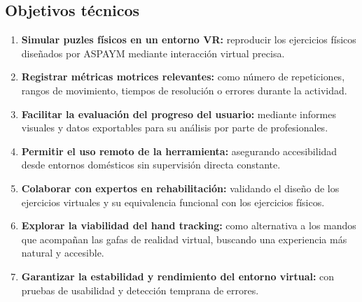 \subsection{Objetivos técnicos}
\label{Objetivos técnicos}
\begin{enumerate}
    \item \textbf{Simular puzles físicos en un entorno VR:} reproducir los ejercicios físicos diseñados por ASPAYM mediante interacción virtual precisa.
    
    \item \textbf{Registrar métricas motrices relevantes:} como número de repeticiones, rangos de movimiento, tiempos de resolución o errores durante la actividad.
    
    \item \textbf{Facilitar la evaluación del progreso del usuario:} mediante informes visuales y datos exportables para su análisis por parte de profesionales.
    
    \item \textbf{Permitir el uso remoto de la herramienta:} asegurando accesibilidad desde entornos domésticos sin supervisión directa constante.
    
    \item \textbf{Colaborar con expertos en rehabilitación:} validando el diseño de los ejercicios virtuales y su equivalencia funcional con los ejercicios físicos.
    
    \item \textbf{Explorar la viabilidad del hand tracking:} como alternativa a los mandos que acompañan las gafas de realidad virtual, buscando una experiencia más natural y accesible.
    
    \item \textbf{Garantizar la estabilidad y rendimiento del entorno virtual:} con pruebas de usabilidad y detección temprana de errores.
\end{enumerate}

